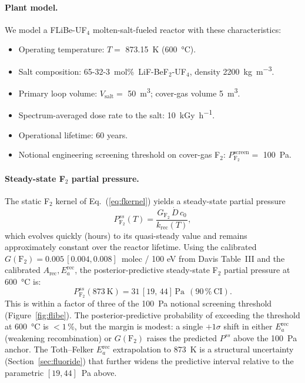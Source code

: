 \documentclass[11pt]{article}
\theoremstyle{plain}
\theoremstyle{definition}
\theoremstyle{remark}
\newcommand{\Ea}{E_a}
\begin{document}
\paragraph{Plant model.}
We model a FLiBe-UF$_4$ molten-salt-fueled reactor with these
characteristics:
\begin{itemize}
\item Operating temperature: $T = $ \SI{873.15}{\kelvin} (\SI{600}{\celsius}).
\item Salt composition: 65-32-3~mol\%~LiF-BeF$_2$-UF$_4$, density
      \SI{2200}{\kilogram\per\meter\cubed}.
\item Primary loop volume: $V_{\mathrm{salt}} = $ \SI{50}{\meter\cubed};
      cover-gas volume \SI{5}{\meter\cubed}.
\item Spectrum-averaged dose rate to the salt: \SI{10}{\kilo\gray\per\hour}.
\item Operational lifetime: 60 years.
\item Notional engineering screening threshold on cover-gas F$_2$:
      $P_{\mathrm{F_2}}^{\mathrm{screen}} =$
      \SI{100}{\pascal}.
\end{itemize}

\paragraph{Steady-state F$_2$ partial pressure.}
The static F$_2$ kernel of Eq.~(\ref{eq:fkernel}) yields a steady-state
partial pressure
\begin{equation}
P_{\mathrm{F_2}}^{ss}(T) = \frac{G_{\mathrm{F}_2}\,\dot{D}\,c_0}{k_{\mathrm{rec}}(T)},
\label{eq:Pf2ss}
\end{equation}
which evolves quickly (hours) to its quasi-steady value and remains
approximately constant over the reactor lifetime.  Using the calibrated
$G(\mathrm{F}_2) = 0.005\,[0.004, 0.008]$~molec / 100 eV from Davis
Table~III and the calibrated $A_{\mathrm{rec}}, \Ea^{\mathrm{rec}}$, the
posterior-predictive steady-state F$_2$ partial pressure at
\SI{600}{\celsius} is:
\begin{equation}
P_{\mathrm{F_2}}^{ss}(\SI{873}{\kelvin}) = 31\,[19,\,44]\,\mathrm{Pa}\ \ (\mathrm{90\,\%\ CI}).
\label{eq:Pf2-result}
\end{equation}
This is within a factor of three of the \SI{100}{\pascal} notional screening
threshold (Figure~\ref{fig:flibe}).  The posterior-predictive probability of
exceeding the threshold at \SI{600}{\celsius} is $< 1$\,\%, but the margin
is modest: a single $+1\sigma$ shift in either $\Ea^{\mathrm{rec}}$
(weakening recombination) or $G(\mathrm{F}_2)$ raises the predicted
$P^{ss}$ above the 100~Pa anchor.  The Toth--Felker $\Ea^{\mathrm{rec}}$
extrapolation to 873~K is a structural uncertainty
(Section~\ref{sec:fluoride}) that further widens the predictive interval
relative to the parametric $[19, 44]$~Pa above.
\end{document}
